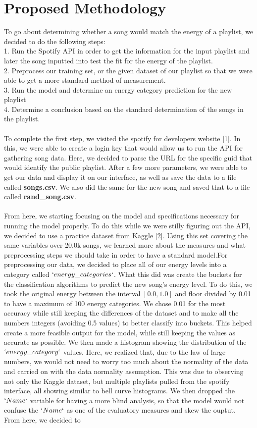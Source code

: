 \documentclass[titlepage]{article}
\begin{document}
\section{Proposed Methodology}
To go about determining whether a song would match the energy of a playlist, we decided to do the following steps:\\
1. Run the Spotify API in order to get the information for the input playlist and later the song inputted into test the fit for the energy of the playlist.\\
2. Preprocess our training set, or the given dataset of our playlist so that we were able to get a more standard method of measurement.\\ 
3. Run the model and determine an energy category prediction for the new playlist\\
4. Determine a conclusion based on the standard determination of the songs in the playlist.\\
\\
To complete the first step, we visited the spotify for developers website [1]. In this, we were able to create a login key that would allow us to run the API for gathering song data. Here, we decided to parse the URL for the specific guid that would identify the public playlist. After a few more parameters, we were able to get our data and display it on our interface, as well as save the data to a file called \textbf{songs.csv}. We also did the same for the new song and saved that to a file called \textbf{rand\_song.csv}.
\\\\
From here, we starting focusing on the model and specifications necessary for running the model properly. To do this while we were stilly figuring out the API, we decided to use a practice dataset from Kaggle [2]. Using this set covering the same variables over 20.0k songs, we learned more about the measures and what preprocessing steps we should take in order to have a standard model.For preprocessing our data, we decided to place all of our energy levels into a category called $`energy\_categories`$. What this did was create the buckets for the classification algorithms to predict the new song's energy level. To do this, we took the original energy between the interval  $[0.0, 1.0]$ and floor divided by 0.01 to have a maximum of 100 energy categories. We chose 0.01 for the most accuracy while still keeping the differences of the dataset and to make all the numbers integers (avoiding 0.5 values) to better classify into buckets. This helped create a more feasible output for the model, while still keeping the values as accurate as possible. We then made a histogram showing the distribution of the $`energy\_category`$ values. Here, we realized that, due to the law of large numbers, we would not need to worry too much about the normality of the data and carried on with the data normality assumption. This was due to observing not only the Kaggle dataset, but multiple playlists pulled from the spotify interface, all showing similar to bell curve histograms. We then dropped the $`Name`$ variable for having a more blind analysis, so that the model would not confuse the $`Name`$ as one of the evaluatory measures and skew the ouptut. From here, we decided to 
\end{document}
